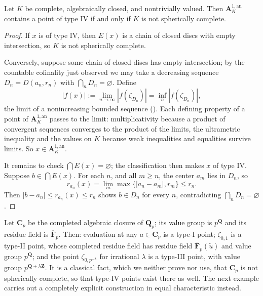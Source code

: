 \begin{proposition}
\label{prop:berk-type4-spherical}
Let $K$ be complete, algebraically closed, and nontrivially valued.
Then $\mathbf A^{1,\mathrm{an}}_K$ contains a point of type IV if and
only if $K$ is not spherically complete.
\end{proposition}

\begin{proof}
If $x$ is of type IV, then $E(x)$ is a chain of closed discs with
empty intersection, so $K$ is not spherically complete.

Conversely, suppose some chain of closed discs has empty intersection;
by the countable cofinality just observed we may take a decreasing
sequence $D_n=D(a_n,r_n)$ with
$\bigcap_nD_n=\varnothing$.  Define
\[
 |f(x)|:=\lim_{n\to\infty}|f(\zeta_{D_n})|
        =\inf_n|f(\zeta_{D_n})|,
\]
the limit of a nonincreasing bounded sequence
().  Each defining property of a
point of $\mathbf A^{1,\mathrm{an}}_K$ passes to the limit:
multiplicativity because a product of convergent sequences converges to
the product of the limits, the ultrametric inequality and the values on
$K$ because weak inequalities and equalities survive limits.  So
$x\in\mathbf A^{1,\mathrm{an}}_K$.

It remains to check $\bigcap E(x)=\varnothing$; the classification
then makes $x$ of type IV.  Suppose $b\in\bigcap E(x)$.  For each
$n$, and all $m\geq n$, the center $a_m$ lies in $D_n$, so
\[
 r_{a_n}(x)=\lim_m\max\{|a_n-a_m|,r_m\}\leq r_n .
\]
Then $|b-a_n|\leq r_{a_n}(x)\leq r_n$ shows $b\in D_n$ for every
$n$, contradicting $\bigcap_nD_n=\varnothing$.
\end{proof}

\begin{example}
\label{ex:berk-types-cp}
Let $\mathbf C_p$ be the completed algebraic closure of
$\mathbf Q_p$; its value group is $p^{\mathbf Q}$ and its residue
field is $\overline{\mathbf F}_p$.  Then:
evaluation at any $a\in\mathbf C_p$ is a type-I point;
$\zeta_{0,1}$ is a type-II point, whose completed residue field has
residue field $\overline{\mathbf F}_p(\tilde u)$ and value group
$p^{\mathbf Q}$; and the point $\zeta_{0,p^{-\lambda}}$ for
irrational $\lambda$ is a type-III point, with value group
$p^{\mathbf Q+\lambda\mathbf Z}$.  It is a classical fact, which we
neither prove nor use, that $\mathbf C_p$ is not spherically
complete, so that type-IV points exist there as well.  The next
example carries out a completely explicit construction in equal
characteristic instead.
\end{example}

